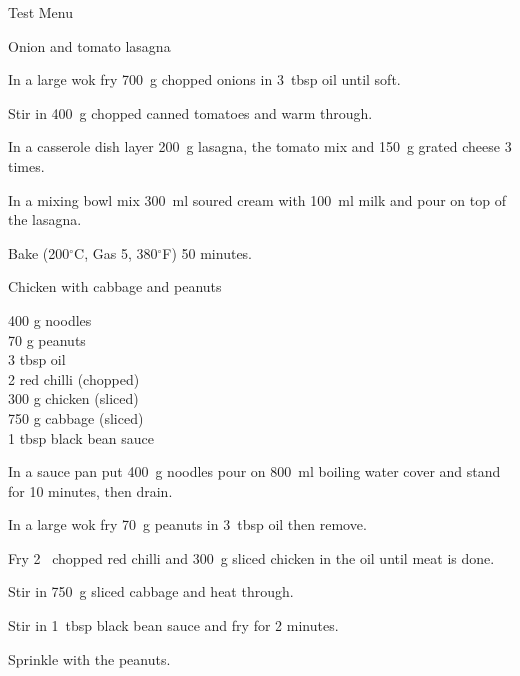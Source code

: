 \begin{menu}{Test Menu}
\begin{recipe}{2}{Onion and tomato lasagna}
\begin{ingredients}
		\end{ingredients}
	
	
    \begin{instructions}
    \item 
        In a large wok fry
        700~g chopped onions
        in
        3~tbsp  oil
        until soft.
      \item 
        Stir in 400~g chopped canned tomatoes
        and warm through.
      \item 
        In a casserole dish layer
        200~g  lasagna,
        the tomato mix and
        150~g grated cheese
        3 times.
      \item 
        In a mixing bowl mix
        300~ml  soured cream
        with
        100~ml  milk
        and pour on top of the lasagna.
      \item 
        Bake 
      (200$^{\circ}$C, Gas 5, 380$^{\circ}$F)
     50 minutes.
      
    \end{instructions}
    \end{recipe}%
  
    \begin{recipe}{2}{Chicken with cabbage and peanuts}%
    
		\begin{ingredients}
		400 g noodles  \\
	70 g peanuts  \\
	3 tbsp oil  \\
	2  red chilli (chopped) \\
	300 g chicken (sliced) \\
	750 g cabbage (sliced) \\
	1 tbsp black bean sauce  \\
	
		\end{ingredients}
	
    \begin{instructions}
    \item 
      In a sauce pan
      put
      400~g  noodles
      pour on
      800~ml  boiling water
      cover and stand for 10 minutes, then drain.
    \item 
        In a large wok	fry
        70~g  peanuts
        in
        3~tbsp  oil
        then remove.
      \item 
        Fry 2~ chopped red chilli
        and
        300~g sliced chicken
        in the oil until meat is done.
      \item 
        Stir in
        750~g sliced cabbage
        and heat through.
      \item 
        Stir in
        1~tbsp  black bean sauce
        and fry for 2 minutes.
      \item 
        Sprinkle with the peanuts.
      

\end{instructions}
\end{recipe}
\end{menu}
